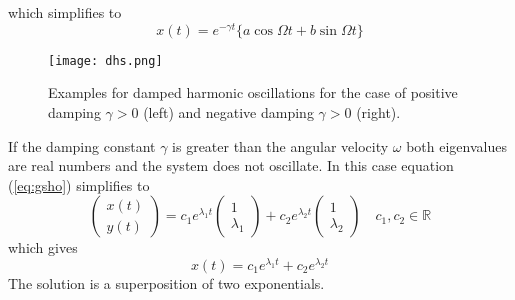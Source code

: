 which simplifies to 
\begin{equation}
	x(t)=e^{-\gamma t}\{a\cos\Omega t+b\sin\Omega t\}
\end{equation}
\begin{figure}[h!]
	\centering
	\texttt{[image: dhs.png]}
	\caption{Examples for damped harmonic oscillations for the case of positive damping $\gamma>0$ (left) and negative damping $\gamma>0$ (right).}
	\label{fig:dhs}
\end{figure}
If the damping constant $\gamma$ is greater than the angular velocity $\omega$ both eigenvalues are real numbers and the system does not oscillate. In this case equation (\ref{eq:gsho}) simplifies to 
\begin{equation}
	\begin{pmatrix}
		x(t)\\y(t)
	\end{pmatrix}=
	c_1e^{\lambda_1t}
	\begin{pmatrix}
		1\\\lambda_1
	\end{pmatrix}+
	c_2e^{\lambda_2t}
	\begin{pmatrix}
		1\\\lambda_2
	\end{pmatrix}\quad
	c_1,c_2\in\mathbb{R}
\end{equation}
which gives
\begin{equation}
	x(t)=c_1e^{\lambda_1t}+c_2e^{\lambda_2t}
\end{equation}
The solution is a superposition of two exponentials.